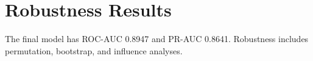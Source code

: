\section{Robustness Results}
The final model has ROC-AUC 0.8947 and PR-AUC 0.8641. Robustness includes permutation, bootstrap, and influence analyses.
